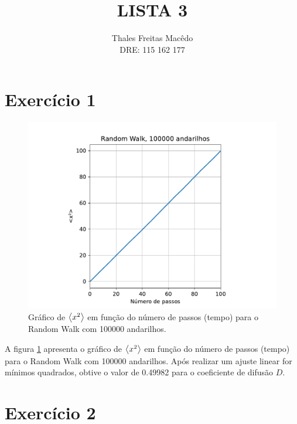 \documentclass[a4paper, brazil]{article}
\author{Thales Freitas Macêdo \\ DRE: 115 162 177}
\title{LISTA 3}
\begin{document}
\maketitle

\section{Exercício 1}

\begin{figure}[ht]
\centering
\includegraphics[width=\textwidth]{fig_1.pdf}
\caption{Gráfico de \( \expval{x^2} \) em função do número de passos (tempo) para o Random Walk com 100000 andarilhos.}\label{fig1}
\end{figure}

A figura \ref{fig1} apresenta o gráfico de \( \expval{x^2} \) em função do número de passos (tempo) para o Random Walk com 100000 andarilhos.
Após realizar um ajuste linear for mínimos quadrados, obtive o valor de \num{0.49982} para o coeficiente de difusão \( D \).

\newpage
\section{Exercício 2}
\end{document}
